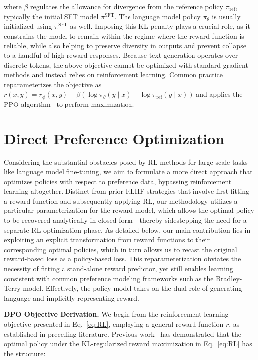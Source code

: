 where $\beta$ regulates the allowance for divergence from the reference policy $\pi_\text{ref}$, typically the initial SFT model $\pi^\text{SFT}$. The language model policy $\pi_\theta$ is usually initialized using $\pi^\text{SFT}$ as well. Imposing this KL penalty plays a crucial role, as it constrains the model to remain within the regime where the reward function is reliable, while also helping to preserve diversity in outputs and prevent collapse to a handful of high-reward responses. Because text generation operates over discrete tokens, the above objective cannot be optimized with standard gradient methods and instead relies on reinforcement learning. Common practice~\citep{ziegler2020finetuning, stiennon2022learning, bai2022training, ouyang2022training} reparameterizes the objective as ${r(x, y) = r_{\phi}(x, y) -\beta (\log \pi_{\theta}(y\mid x) - \log \pi_\text{ref}(y\mid x))}$ and applies the PPO algorithm~\cite{schulman2017proximal} to perform maximization.

\section{Direct Preference Optimization}\label{sec:DPO}

Considering the substantial obstacles posed by RL methods for large-scale tasks like language model fine-tuning, we aim to formulate a more direct approach that optimizes policies with respect to preference data, bypassing reinforcement learning altogether. Distinct from prior RLHF strategies that involve first fitting a reward function and subsequently applying RL, our methodology utilizes a particular parameterization for the reward model, which allows the optimal policy to be recovered analytically in closed form—thereby sidestepping the need for a separate RL optimization phase. As detailed below, our main contribution lies in exploiting an explicit transformation from reward functions to their corresponding optimal policies, which in turn allows us to recast the original reward-based loss as a policy-based loss. This reparameterization obviates the necessity of fitting a stand-alone reward predictor, yet still enables learning consistent with common preference modeling frameworks such as the Bradley-Terry model. Effectively, the policy model takes on the dual role of generating language and implicitly representing reward.

\textbf{DPO Objective Derivation.} We begin from the reinforcement learning objective presented in Eq.~\ref{eq:RL}, employing a general reward function $r$, as established in preceding literature. Previous work~\citep{peters2007reinforcement, peng2019advantage, korbak2022reinforcement, go2023aligning} has demonstrated that the optimal policy under the KL-regularized reward maximization in Eq.~\ref{eq:RL} has the structure:

